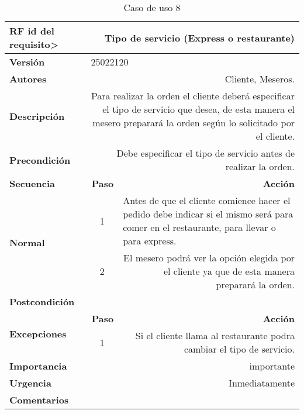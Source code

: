 \documentclass[conference]{IEEEtran}
\begin{document}
\begin{table}[H]
  \centering
   \begin{adjustbox}{width=0.45\textwidth}
    \begin{tabular}{|p{11.215em}|r|r|}
    \toprule
    \textbf{RF id del requisito>} & \multicolumn{2}{p{37.355em}|}{\textbf{Tipo de servicio (Express o restaurante)}} \\
    \midrule
    \textbf{Versión} & \multicolumn{2}{l|}{25022120} \\
    \midrule
    \textbf{Autores} & \multicolumn{2}{p{37.355em}|}{Cliente, Meseros.} \\
    \midrule
    \textbf{Descripción} & \multicolumn{2}{p{37.355em}|}{Para realizar la orden el cliente deberá especificar el tipo de servicio que desea, de esta manera el mesero preparará la orden según lo solicitado por el cliente.} \\
    \midrule
    \textbf{Precondición} & \multicolumn{2}{p{37.355em}|}{Debe especificar el tipo de servicio antes de realizar la orden.} \\
    \midrule
    \textbf{Secuencia} & \multicolumn{1}{p{5.355em}|}{\textbf{Paso}} & \multicolumn{1}{p{32em}|}{\textbf{Acción}} \\
    \midrule
    \multirow{3}[4]{*}{\textbf{Normal}} & \multicolumn{1}{c|}{\multirow{2}[2]{*}{1}} & \multicolumn{1}{l|}{\multirow{2}[2]{*}{Antes de que el cliente comience hacer el pedido debe indicar si el mismo será para comer en el restaurante, para llevar o para express.}} \\
    \multicolumn{1}{|c|}{} & \multicolumn{1}{c|}{} &  \\
\cmidrule{2-3}    \multicolumn{1}{|c|}{} & \multicolumn{1}{c|}{2} & \multicolumn{1}{p{32em}|}{El mesero podrá ver la opción elegida por el cliente ya que de esta manera preparará la orden.} \\
    \midrule
    \textbf{Postcondición} & \multicolumn{2}{r|}{} \\
    \midrule
    \multirow{2}[4]{*}{\textbf{Excepciones}} & \multicolumn{1}{p{5.355em}|}{\textbf{Paso}} & \multicolumn{1}{p{32em}|}{\textbf{Acción}} \\
\cmidrule{2-3}    \multicolumn{1}{|c|}{} & \multicolumn{1}{c|}{1} & \multicolumn{1}{p{32em}|}{Si el cliente llama al restaurante podra cambiar el tipo de servicio.} \\
    \midrule
    \textbf{Importancia} & \multicolumn{2}{p{37.355em}|}{importante } \\
    \midrule
    \textbf{Urgencia} & \multicolumn{2}{p{37.355em}|}{Inmediatamente} \\
    \midrule
    \textbf{Comentarios} & \multicolumn{2}{r|}{} \\
    \bottomrule
    \end{tabular}%
    \end{adjustbox}
    \vspace{0.2cm}
    \caption{Caso de uso 8}
  \label{tab:addlabel}%
\end{table}%
\end{document}
